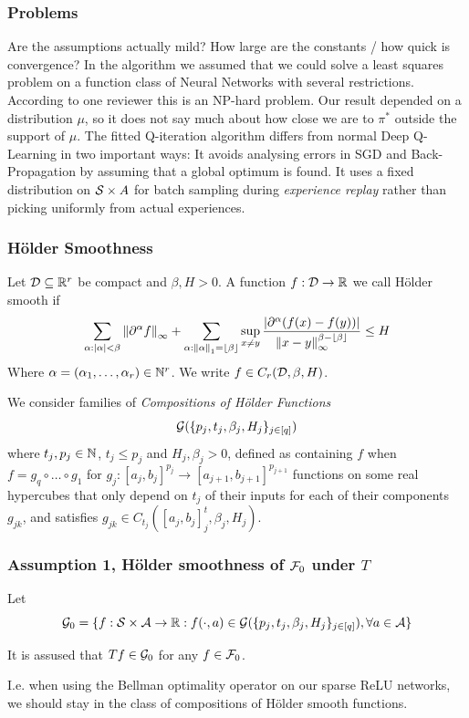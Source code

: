 \documentclass{beamer}
\begin{document}
\begin{frame}
	\frametitle{Problems}
	\begin{outline}
		\1 Are the assumptions actually mild?
		\1 How large are the constants / how quick is convergence?
		\1 In the algorithm we assumed that we could solve a least squares problem
			on a function class of Neural Networks with several restrictions.
			According to one reviewer this is an NP-hard problem.
		\1 Our result depended on a distribution $\mu$, so it does not say much
			about how close we are to $\pi^*$ outside the support of $\mu$.
		\1 The fitted Q-iteration algorithm differs from
			normal Deep Q-Learning in two important ways:
			\2 It avoids analysing errors in SGD and Back-Propagation 
			by assuming that a global optimum is found.
			\2 It uses a fixed distribution on $\mathcal{S}\times{A}$ for batch sampling
			during \emph{experience replay} rather than picking
			uniformly from actual experiences.
	\end{outline}
\end{frame}


\begin{frame}
	\frametitle{Hölder Smoothness}
	\begin{Defi}
		Let $\mathcal{D}\subseteq \mathbb{R}^r$ be compact and $\beta,H>0$. A function $f:\mathcal{D}\to \mathbb{R}$
		we call Hölder smooth if
		\[ \sum_{{\alpha} : |{\alpha}| < \beta}
			\left\lVert\partial^{\alpha}f\right\rVert_\infty +
			\sum_{{\alpha} : \left\lVert{\alpha}\right\rVert_1 = \lfloor\beta\rfloor}
			\sup_{x \neq y} \frac{|\partial^\alpha (f(x) - f(y))|}
			{\left\lVert x-y\right\rVert_\infty^{\beta-\lfloor\beta\rfloor}} \leq H \] 
		Where $\alpha = (\alpha_1, \dots, \alpha_r) \in \mathbb{N}^r$.
		We write $f \in C_r(\mathcal{D}, \beta, H)$.
	\end{Defi}
	We consider families of \emph{Compositions of Hölder Functions}
	\[ \mathcal{G}(\{p_j, t_j, \beta_j, H_j\}_{j \in [q]}) \]
	where $t_j, p_j \in \mathbb{N}$, $t_j\leq p_j$ and $H_j, \beta_j > 0$,
	defined as containing $f$ when $f = g_q \circ \dots \circ g_1$
	for $g_j : [a_j, b_j]^{p_j} \to [a_{j+1}, b_{j+1}]^{p_{j+1}}$
	functions on some real hypercubes that only depend on $t_j$ of their inputs
	for each of their components $g_{jk}$,
	and satisfies $g_{jk} \in C_{t_j}([a_j, b_j]^t_j, \beta_j, H_j)$.
\end{frame}

\begin{frame}
	\frametitle{Assumption 1, Hölder smoothness of $\mathcal{F}_0$ under $T$}
	Let
	\[ \mathcal{G}_0 = \{ f : \mathcal{S} \times \mathcal{A} \to \mathbb{R} : f(\cdot, a) \in
		\mathcal{G}(\{p_j, t_j, \beta_j, H_j \}_{j \in [q]} ), \forall a\in \mathcal{A} \} \]
	
	It is assused that $T f \in \mathcal{G}_0$ for any $f \in \mathcal{F}_0$.

	I.e. when using the Bellman optimality operator on our sparse ReLU networks,
	we should stay in the class of compositions of Hölder smooth functions.
\end{frame}
\end{document}
